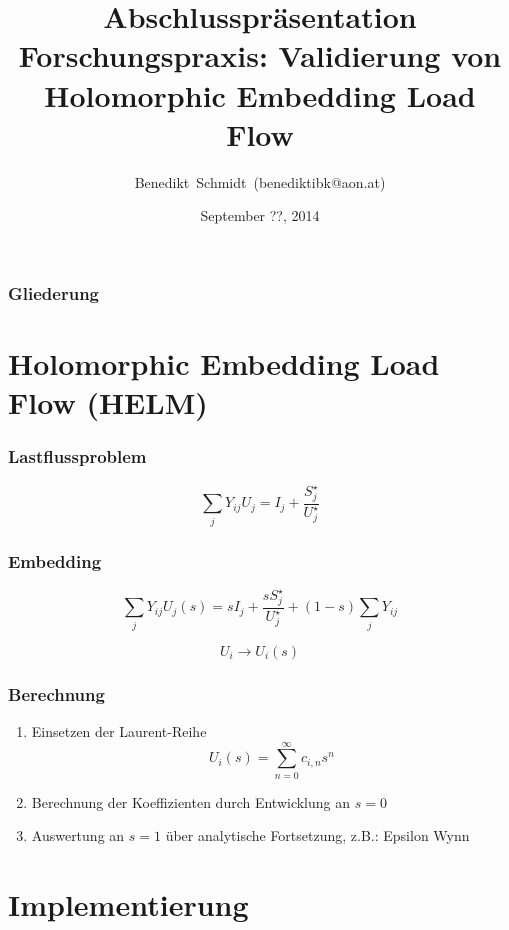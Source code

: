 \documentclass[hyperref={pdfpagelabels=false},compress]{beamer}
\title{Abschlusspräsentation Forschungspraxis: Validierung von Holomorphic Embedding Load Flow}
\author[Schmidt]{Benedikt~Schmidt~(benediktibk@aon.at)}
\institute{Technische Universität München, Germany}
\date{September ??, 2014}
\begin{document}
\begin{frame}
	\titlepage
\end{frame}

\begin{frame}
	\frametitle{Gliederung}
	\tableofcontents
\end{frame}

\section{Holomorphic Embedding Load Flow (HELM)}
\begin{frame}
	\frametitle{Lastflussproblem}
	\begin{figure}
		\centering
		
	\end{figure}	
	\begin{equation*}
		\sum_j Y_{ij} U_{j} = I_j + \frac{S_j^\star}{U_j^\star}
	\end{equation*}
\end{frame}

\begin{frame}
	\frametitle{Embedding}
	\begin{equation*}
		\sum_j Y_{ij} U_{j}(s) = s I_j + \frac{s S_j^\star}{U_j^\star} + (1 - s) \sum_j Y_{ij}
	\end{equation*}
	
	\begin{equation*}
		U_i \rightarrow U_i(s)
	\end{equation*}
\end{frame}

\begin{frame}
	\frametitle{Berechnung}
	\begin{enumerate}
		\item Einsetzen der Laurent-Reihe
			\begin{equation*}
				U_i(s) = \sum_{n = 0}^\infty c_{i,n} s^n
			\end{equation*}
		\item Berechnung der Koeffizienten durch Entwicklung an $s = 0$
		\item Auswertung an $s = 1$ über analytische Fortsetzung, z.B.: Epsilon Wynn
	\end{enumerate}
\end{frame}

\section{Implementierung}
\end{document}

